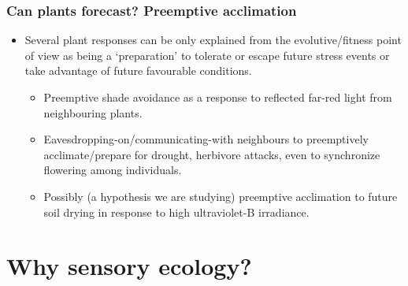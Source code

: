 \documentclass[10pt]{beamer}\usepackage[]{graphicx}\usepackage[]{color}
\begin{document}
\begin{frame}[<+->]
  \frametitle{Can plants forecast? Preemptive acclimation}
   \begin{itemize}
    \item Several plant responses can be only explained from the evolutive/fitness
    point of view as being a `preparation' to tolerate or escape future stress events or
    take advantage of future favourable conditions.
    \begin{itemize}
    \item Preemptive shade avoidance as a response to reflected far-red light from neighbouring
    plants.
    \item Eavesdropping-on/communicating-with neighbours to preemptively acclimate/prepare
    for drought, herbivore attacks, even to synchronize flowering among individuals.
    \item Possibly (a hypothesis we are studying) preemptive acclimation to future soil
    drying in response to high ultraviolet-B irradiance.
 \end{itemize}
  \end{itemize}
\end{frame}

\section{Why sensory ecology?}

\end{document}
